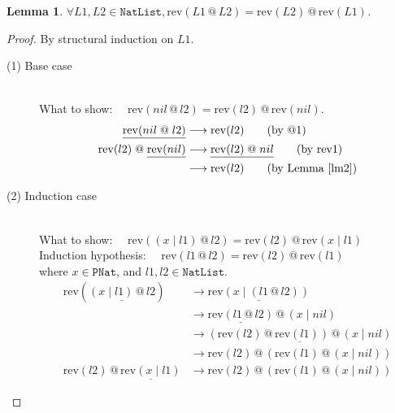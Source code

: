\documentclass[12pt, a4paper]{article}
\newtheorem{lemma}[theorem]{Lemma}
\newcommand{\rel}[1]{\mathrel{#1}}
\newcommand{\rmx}[1]{\mathrm{#1}}
\newcommand{\larrow}{\longrightarrow}
\newcommand{\under}{\underline}
\begin{document}
\begin{lemma}
\label{lm1}
$\forall L1, L2 \in \mathtt{NatList}, \rmx{rev}(L1 \rel{@} L2) = \rmx{rev}(L2) \rel{@} \rmx{rev}(L1)$.
\end{lemma}
\begin{proof}
By structural induction on $L1$.

\begin{description}

\item[(1) Base case]~\\
\noindent
What to show: $\quad \rmx{rev}(nil \rel{@} l2) = \rmx{rev}(l2) \rel{@} \rmx{rev}(nil)$.
\begin{align*}
\under{\rmx{rev}(nil \rel{@} l2)}
	&\larrow \rmx{rev}(l2) \tag{by @1} \\
\rmx{rev}(l2) \rel{@} \under{\rmx{rev}(nil)}
	&\larrow \under{\rmx{rev}(l2) \rel{@} nil} \tag{by rev1} \\
	&\larrow \rmx{rev}(l2) \tag{by Lemma~\ref{lm2}}
\end{align*}

\item[(2) Induction case]~\\
What to show: $\quad \rmx{rev}((x \rel{|} l1) \rel{@} l2) = \rmx{rev}(l2) \rel{@} \rmx{rev}(x \rel{|} l1)$ \\
Induction hypothesis: $\quad \rmx{rev}(l1 \rel{@} l2) = \rmx{rev}(l2) \rel{@} \rmx{rev}(l1)$  \\
where $x \in \mathtt{PNat}$, and $l1, l2 \in \mathtt{NatList}$.
\begin{align*}
\rmx{rev}(\under{(x \rel{|} l1) \rel{@} l2}) 
	&\larrow \under{\rmx{rev}(x \rel{|} (l1 \rel{@} l2))} \tag{by @2} \\
	&\larrow \under{\rmx{rev}(l1 \rel{@} l2)} \rel{@} (x \rel{|} nil) \tag{by rev2} \\
	&\larrow \under{(\rmx{rev}(l2) \rel{@} \rmx{rev}(l1)) \rel{@} (x \rel{|} nil)} \tag{by IH} \\
	&\larrow \rmx{rev}(l2) \rel{@} (\rmx{rev}(l1) \rel{@} (x \rel{|} nil)) \tag{by Lemma 2 in Problem 2} \\
\rmx{rev}(l2) \rel{@} \under{\rmx{rev}(x \rel{|} l1)}
	&\larrow \rmx{rev}(l2) \rel{@} (\rmx{rev}(l1) \rel{@} (x \rel{|} nil)) \tag{by rev2}
\end{align*}

\end{description}
\end{proof}
\end{document}
